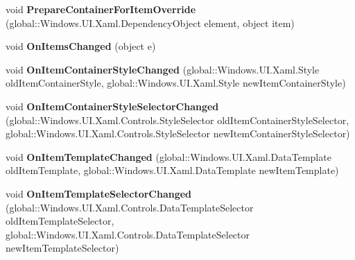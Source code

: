 \begin{DoxyCompactItemize}
void {\bfseries Prepare\+Container\+For\+Item\+Override} (global\+::\+Windows.\+U\+I.\+Xaml.\+Dependency\+Object element, object item)
\item 
\mbox{\label{interface_windows_1_1_u_i_1_1_xaml_1_1_controls_1_1_i_items_control_overrides_aeca7ab8e157178a6cc021cee26bf5388}} 
void {\bfseries On\+Items\+Changed} (object e)
\item 
\mbox{\label{interface_windows_1_1_u_i_1_1_xaml_1_1_controls_1_1_i_items_control_overrides_aec19844110896dfbbe9fb5a9ddea5cea}} 
void {\bfseries On\+Item\+Container\+Style\+Changed} (global\+::\+Windows.\+U\+I.\+Xaml.\+Style old\+Item\+Container\+Style, global\+::\+Windows.\+U\+I.\+Xaml.\+Style new\+Item\+Container\+Style)
\item 
\mbox{\label{interface_windows_1_1_u_i_1_1_xaml_1_1_controls_1_1_i_items_control_overrides_a4d197dd9f2dbb42d5ba7828014c6d966}} 
void {\bfseries On\+Item\+Container\+Style\+Selector\+Changed} (global\+::\+Windows.\+U\+I.\+Xaml.\+Controls.\+Style\+Selector old\+Item\+Container\+Style\+Selector, global\+::\+Windows.\+U\+I.\+Xaml.\+Controls.\+Style\+Selector new\+Item\+Container\+Style\+Selector)
\item 
\mbox{\label{interface_windows_1_1_u_i_1_1_xaml_1_1_controls_1_1_i_items_control_overrides_ac592214833c559a28551ba9ccb0b4d2a}} 
void {\bfseries On\+Item\+Template\+Changed} (global\+::\+Windows.\+U\+I.\+Xaml.\+Data\+Template old\+Item\+Template, global\+::\+Windows.\+U\+I.\+Xaml.\+Data\+Template new\+Item\+Template)
\item 
\mbox{\label{interface_windows_1_1_u_i_1_1_xaml_1_1_controls_1_1_i_items_control_overrides_a30660077603ff4ebf8b8f749780afbd1}} 
void {\bfseries On\+Item\+Template\+Selector\+Changed} (global\+::\+Windows.\+U\+I.\+Xaml.\+Controls.\+Data\+Template\+Selector old\+Item\+Template\+Selector, global\+::\+Windows.\+U\+I.\+Xaml.\+Controls.\+Data\+Template\+Selector new\+Item\+Template\+Selector)
\item 

\end{DoxyCompactItemize}
